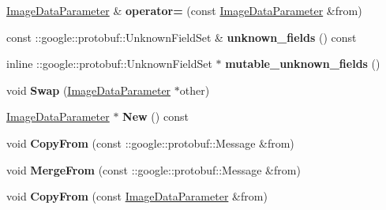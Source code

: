 \begin{DoxyCompactItemize}
\mbox{\hyperlink{classcaffe_1_1_image_data_parameter}{Image\+Data\+Parameter}} \& {\bfseries operator=} (const \mbox{\hyperlink{classcaffe_1_1_image_data_parameter}{Image\+Data\+Parameter}} \&from)
\item 
\mbox{\label{classcaffe_1_1_image_data_parameter_a65361ae895e7814a40da38af92997b5a}} 
const \+::google\+::protobuf\+::\+Unknown\+Field\+Set \& {\bfseries unknown\+\_\+fields} () const
\item 
\mbox{\label{classcaffe_1_1_image_data_parameter_a22dccf8b16a6e98ef6b0151887167f98}} 
inline \+::google\+::protobuf\+::\+Unknown\+Field\+Set $\ast$ {\bfseries mutable\+\_\+unknown\+\_\+fields} ()
\item 
\mbox{\label{classcaffe_1_1_image_data_parameter_ada878990e5fe86edc4c8b3c3393673ab}} 
void {\bfseries Swap} (\mbox{\hyperlink{classcaffe_1_1_image_data_parameter}{Image\+Data\+Parameter}} $\ast$other)
\item 
\mbox{\label{classcaffe_1_1_image_data_parameter_aede704fbaeefa4d5c50190b1a2f1c1e7}} 
\mbox{\hyperlink{classcaffe_1_1_image_data_parameter}{Image\+Data\+Parameter}} $\ast$ {\bfseries New} () const
\item 
\mbox{\label{classcaffe_1_1_image_data_parameter_a29e481f0c1818a3c14d451909b196f43}} 
void {\bfseries Copy\+From} (const \+::google\+::protobuf\+::\+Message \&from)
\item 
\mbox{\label{classcaffe_1_1_image_data_parameter_aeacf1f8710289fdb608d766ea3a53d02}} 
void {\bfseries Merge\+From} (const \+::google\+::protobuf\+::\+Message \&from)
\item 
\mbox{\label{classcaffe_1_1_image_data_parameter_a4d93d9bad54206ad4db90a6d6043015a}} 
void {\bfseries Copy\+From} (const \mbox{\hyperlink{classcaffe_1_1_image_data_parameter}{Image\+Data\+Parameter}} \&from)
\item 
\mbox{\label{classcaffe_1_1_image_data_parameter_ad3a44eb972536ec4455cd8c6fea14316}} 

\end{DoxyCompactItemize}
